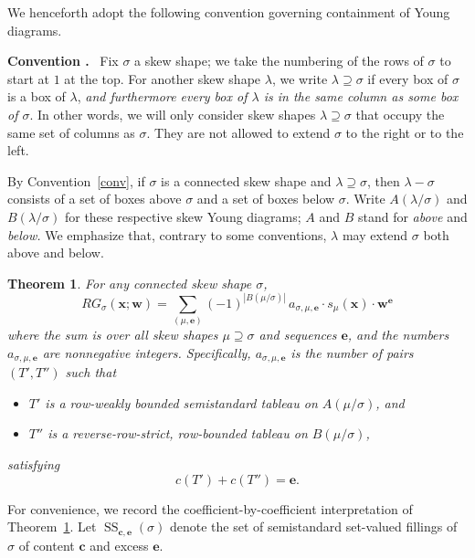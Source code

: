 \documentclass[11pt]{article}
\newtheorem{theorem}{Theorem}[section]
\theoremstyle{definition}
\newenvironment{enonce}[1]{\refstepcounter{theorem}\par\medskip\noindent\textbf{#1 \thetheorem.}\ }{\par\medskip}
\DeclareMathOperator{\Semi}{SS}
\newcommand{\bfc}{\mathbf{c}}
\newcommand{\bfe}{\mathbf{e}}
\newcommand{\bfw}{\mathbf{w}}
\newcommand{\bfx}{\mathbf{x}}
\begin{document}
We henceforth adopt the following convention governing containment of Young diagrams. 
\begin{enonce}{Convention}\label{conv}
Fix $\sigma$ a skew shape; we take the numbering of the rows of $\sigma$ to start at $1$ at the top. For another skew shape $\lambda$, we write $\lambda \supseteq \sigma$ if every box of $\sigma$ is a box of $\lambda$, \emph{and furthermore every box of $\lambda$ is in the same column as some box of $\sigma$}. In other words, we will only consider skew shapes $\lambda\supseteq \sigma$ that occupy the same set of columns as $\sigma$. They are not allowed to extend $\sigma$ to the right or to the left.
\end{enonce}

By Convention~\ref{conv}, if $\sigma$ is a connected skew shape and $\lambda\supseteq \sigma$, then $\lambda - \sigma$ consists of a set of boxes above $\sigma$ and a set of boxes below $\sigma$. Write $A(\lambda/\sigma)$ and $B(\lambda/\sigma)$ for these respective skew Young diagrams; $A$ and $B$ stand for \emph{above} and \emph{below.} We emphasize that, contrary to some conventions, $\lambda$ may extend $\sigma$ both above and below.



\begin{theorem}\label{t:refinedcount} For any connected skew shape $\sigma$, 
\[
RG_\sigma(\bfx;\bfw) = \sum_{(\mu,\bfe)} (-1)^{| B(\mu/\sigma)|} \,a_{\sigma,\mu,\bfe} \cdot s_\mu(\bfx) \cdot\bfw^\bfe 
\]
where the sum is over all skew shapes $\mu\supseteq \sigma$ and sequences $\bfe$, and the numbers $a_{\sigma,\mu,\bfe}$ are nonnegative integers. Specifically, $a_{\sigma,\mu,\bfe}$ is the number of pairs $(T',T'')$ such that
\begin{itemize}
\item $T'$ is a row-weakly bounded semistandard tableau on $A(\mu/\sigma)$, and
\item $T''$ is a reverse-row-strict, row-bounded tableau on $B(\mu/\sigma)$, 
\end{itemize}
satisfying 
\[
c(T') + c(T'') = \bfe.
\]
\end{theorem}

For convenience, we record the coefficient-by-coefficient interpretation of Theorem~\ref{t:refinedcount}. Let $\Semi_{\bfc,\bfe}(\sigma)$ denote the set of semistandard set-valued fillings of $\sigma$ of content $\bfc$ and excess $\bfe$.
\end{document}
